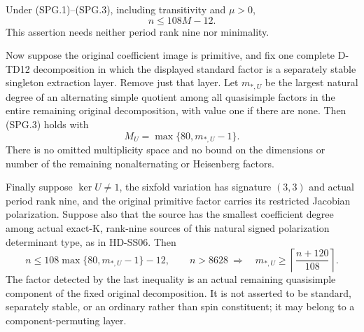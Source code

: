 \begin{theorem}[D-TD44]
Under (SPG.1)--(SPG.3), including transitivity and \(\mu>0\),
\[
                              n\le108M-12.
 \tag{SPG.4}
\]
This assertion needs neither period rank nine nor minimality.

Now suppose the original coefficient image is primitive, and fix one
complete D-TD12 decomposition in which the displayed standard factor is
a separately stable singleton extraction layer.  Remove just that layer.
Let \(m_{*,U}\) be the largest natural degree of an alternating simple
quotient among all quasisimple factors in the entire remaining original
decomposition, with value one if there are none.  Then (SPG.3) holds with
\[
                         M_U=\max\{80,m_{*,U}-1\}.
 \tag{SPG.5}
\]
There is no omitted multiplicity space and no bound on the dimensions
or number of the remaining nonalternating or Heisenberg factors.

Finally suppose \(\ker U\ne1\), the sixfold variation has signature
\((3,3)\) and actual period rank nine, and the original primitive factor
carries its restricted Jacobian polarization.  Suppose also that the
source has the smallest coefficient degree among actual exact-K,
rank-nine sources of this natural signed polarization determinant type,
as in HD-SS06.  Then
\[
 n\le108\max\{80,m_{*,U}-1\}-12,
 \qquad
 n>8628\ \Longrightarrow\quad
       m_{*,U}\ge\left\lceil\frac{n+120}{108}\right\rceil.
 \tag{SPG.6}
\]
The factor detected by the last inequality is an actual remaining
quasisimple component of the fixed original decomposition.  It is not
asserted to be standard, separately stable, or an ordinary rather than
spin constituent; it may belong to a component-permuting layer.
\end{theorem}

